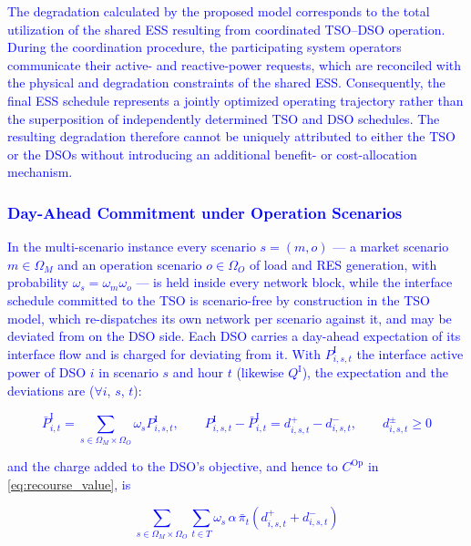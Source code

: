 \documentclass[preprint,12pt]{elsarticle}
\begin{document}
\textcolor{blue}{
    The degradation calculated by the proposed model corresponds to the total utilization of the shared ESS resulting from coordinated TSO–DSO operation. During the coordination procedure, the participating system operators communicate their active- and reactive-power requests, which are reconciled with the physical and degradation constraints of the shared ESS. Consequently, the final ESS schedule represents a jointly optimized operating trajectory rather than the superposition of independently determined TSO and DSO schedules. The resulting degradation therefore cannot be uniquely attributed to either the TSO or the DSOs without introducing an additional benefit- or cost-allocation mechanism.
}

\subsubsection{\textcolor{blue}{Day-Ahead Commitment under Operation Scenarios}}
\label{subsubsec:commitment}

\textcolor{blue}{
    In the multi-scenario instance every scenario $s = (m, o)$ --- a market scenario $m \in \Omega_M$ and an operation scenario $o \in \Omega_O$ of load and RES generation, with probability $\omega_s = \omega_m \omega_o$ --- is held inside every network block, while the interface schedule committed to the TSO is scenario-free by construction in the TSO model, which re-dispatches its own network per scenario against it, and may be deviated from on the DSO side. 
    Each DSO carries a day-ahead expectation of its interface flow and is charged for deviating from it. With $P^{\text{I}}_{i,s,t}$ the interface active power of DSO $i$ in scenario $s$ and hour $t$ (likewise $Q^{\text{I}}$), the expectation and the deviations are ($\forall i$, $s$, $t$):
}

\textcolor{blue}{
    \begin{equation}
        \bar{P}^{\text{I}}_{i,t} = \sum_{s \in \Omega_M \times \Omega_O} \omega_s P^{\text{I}}_{i,s,t}, \qquad
        P^{\text{I}}_{i,s,t} - \bar{P}^{\text{I}}_{i,t} = d^{+}_{i,s,t} - d^{-}_{i,s,t}, \qquad d^{\pm}_{i,s,t} \ge 0
        \label{eq:commitment_deviation}
    \end{equation}
}

\noindent 
\textcolor{blue}{
    and the charge added to the DSO's objective, and hence to $C^{\text{Op}}$ in \eqref{eq:recourse_value}, is
}

\textcolor{blue}{
    \begin{equation}
        \sum_{s \in \Omega_M \times \Omega_O} \sum_{t \in T} \omega_s \, \alpha \, \bar{\pi}_t
        \left( d^{+}_{i,s,t} + d^{-}_{i,s,t} \right)
        \label{eq:commitment_charge}
    \end{equation}
}
\end{document}
